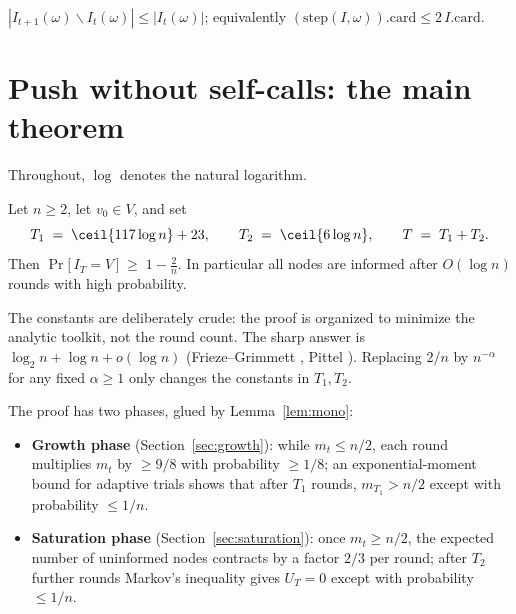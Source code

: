 \begin{lemma}\label{lem:atmost}
  \leanok
  $|I_{t+1}(\omega) \smallsetminus I_t(\omega)| \le |I_t(\omega)|$; equivalently
  $(\mathrm{step}(I,\omega)).\mathrm{card} \le 2\,I.\mathrm{card}$.
\end{lemma}

\section{Push without self-calls: the main theorem}\label{sec:main-statement}

Throughout, $\log$ denotes the natural logarithm.

\begin{theorem}
  \label{thm:main}
  \leanok
  Let $n \ge 2$, let $v_0 \in V$, and set
  \[
    T_1 \;=\; \ceil{117 \log n} + 23, \qquad
    T_2 \;=\; \ceil{6 \log n}, \qquad
    T \;=\; T_1 + T_2 .
  \]
  Then $\Pr\bigl[\, I_T = V \,\bigr] \;\ge\; 1 - \frac{2}{n}$.
  In particular all nodes are informed after $O(\log n)$ rounds with high
  probability.
\end{theorem}

\begin{remark}
  The constants are deliberately crude: the proof is organized to minimize
  the analytic toolkit, not the round count. The sharp answer is
  $\log_2 n + \log n + o(\log n)$ (Frieze--Grimmett \cite{FG85}, Pittel
  \cite{Pittel87}). Replacing $2/n$ by $n^{-\alpha}$ for any fixed
  $\alpha \ge 1$ only changes the constants in $T_1, T_2$.
\end{remark}

The proof has two phases, glued by Lemma~\ref{lem:mono}:
\begin{itemize}
\item \textbf{Growth phase} (Section~\ref{sec:growth}): while $m_t \le n/2$,
  each round multiplies $m_t$ by $\ge 9/8$ with probability $\ge 1/8$;
  an exponential-moment bound for adaptive trials shows that after $T_1$
  rounds, $m_{T_1} > n/2$ except with probability $\le 1/n$.
\item \textbf{Saturation phase} (Section~\ref{sec:saturation}): once
  $m_t \ge n/2$, the expected number of uninformed nodes contracts by a
  factor $2/3$ per round; after $T_2$ further rounds Markov's inequality
  gives $U_T = 0$ except with probability $\le 1/n$.
\end{itemize}

